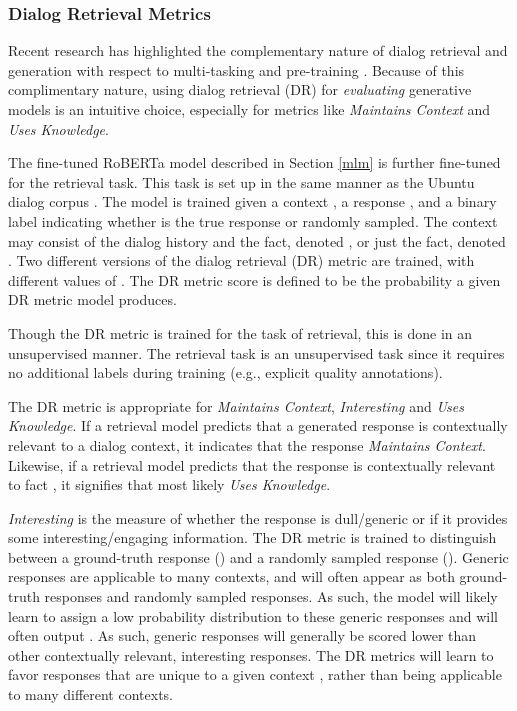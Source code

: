 \documentclass[11pt,a4paper]{article}
\begin{document}
\subsubsection{Dialog Retrieval Metrics}

Recent research has highlighted the complementary nature of dialog retrieval and generation with respect to multi-tasking \citep{wolf2019transfertransfo} and pre-training \citep{mehri2019pretraining}. Because of this complimentary nature, using dialog retrieval (DR) for \textit{evaluating} generative models is an intuitive choice, especially for metrics like \textit{Maintains Context} and \textit{Uses Knowledge}.

The fine-tuned RoBERTa model described in Section \ref{mlm} is further fine-tuned for the retrieval task. This task is set up in the same manner as the Ubuntu dialog corpus \citep{lowe2015ubuntu}. The model is trained given a context , a response , and a binary label  indicating whether  is the true response or randomly sampled. The context  may consist of the dialog history and the fact, denoted , or just the fact, denoted . Two different versions of the dialog retrieval (DR) metric are trained, with different values of . The DR metric score is defined to be the probability  a given DR metric model produces. 

Though the DR metric is trained for the task of retrieval, this is done in an unsupervised manner. The retrieval task is an unsupervised task since it requires no additional labels during training (e.g., explicit quality annotations).


The DR metric is appropriate for \textit{Maintains Context}, \textit{Interesting} and \textit{Uses Knowledge}. If a retrieval model predicts that a generated response is contextually relevant to a dialog context, it indicates that the response \textit{Maintains Context}. Likewise, if a retrieval model predicts that the response  is contextually relevant to fact , it signifies that  most likely \textit{Uses Knowledge}. 

\textit{Interesting} is the measure of whether the response is dull/generic or if it provides some interesting/engaging information. The DR metric is trained to distinguish between a ground-truth response () and a randomly sampled response (). Generic responses are applicable to many contexts, and will often appear as both ground-truth responses and randomly sampled responses. As such, the model will likely learn to assign a low probability distribution to these generic responses and will often output . As such, generic responses will generally be scored lower than other contextually relevant, interesting responses. The DR metrics will learn to favor responses that are unique to a given context , rather than being applicable to many different contexts.
\label{dr}
\end{document}
